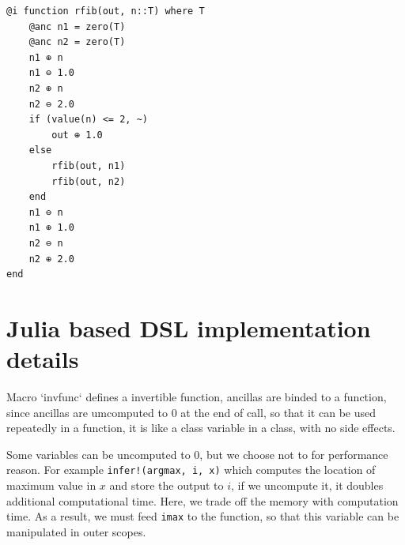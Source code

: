 \documentclass[aps,twocolumn,longbibliography,english,superscriptaddress,prr]{revtex4-1}
\newcommand{\<}{\langle}
\renewcommand{\>}{\rangle}
\begin{document}
\begin{minipage}{.44\textwidth}
\begin{lstlisting}
@i function rfib(out, n::T) where T
    @anc n1 = zero(T)
    @anc n2 = zero(T)
    n1 ⊕ n
    n1 ⊖ 1.0
    n2 ⊕ n
    n2 ⊖ 2.0
    if (value(n) <= 2, ~)
        out ⊕ 1.0
    else
        rfib(out, n1)
        rfib(out, n2)
    end
    n1 ⊖ n
    n1 ⊕ 1.0
    n2 ⊖ n
    n2 ⊕ 2.0
end
\end{lstlisting}
\end{minipage}


\section{Julia based DSL implementation details}

Macro `invfunc` defines a invertible function, ancillas are binded to a function, since ancillas are umcomputed to $0$ at the end of call, so that it can be used repeatedly in a function, it is like a class variable in a class, with no side effects.

Some variables can be uncomputed to $0$, but we choose not to for performance reason. For example
\texttt{infer!(argmax, i, x)} which computes the location of maximum value in $x$ and store the output to $i$, if we uncompute it, it doubles additional computational time. Here, we trade off the memory with computation time. As a result, we must feed \texttt{imax} to the function, so that this variable can be manipulated in outer scopes.

\end{document}
